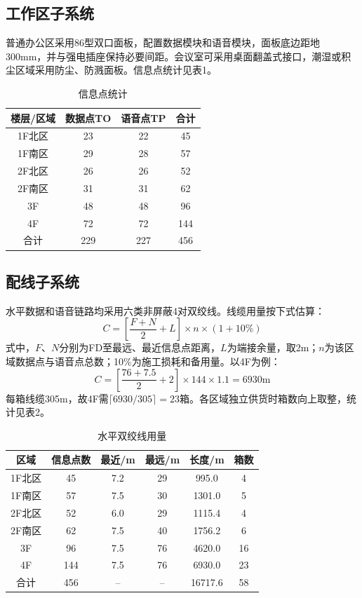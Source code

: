 \documentclass[UTF8,a4paper,12pt]{ctexart}
\begin{document}
\clearpage
\subsection{工作区子系统}
普通办公区采用86型双口面板，配置数据模块和语音模块，面板底边距地300mm，并与强电插座保持必要间距。会议室可采用桌面翻盖式接口，潮湿或积尘区域采用防尘、防溅面板。信息点统计见表1。

\begin{table}[H]
\centering
\caption{信息点统计}
\small
\begin{tabular}{|c|c|c|c|}
\hline
楼层/区域 & 数据点TO & 语音点TP & 合计\\ \hline
1F北区 & 23 & 22 & 45\\
1F南区 & 29 & 28 & 57\\
2F北区 & 26 & 26 & 52\\
2F南区 & 31 & 31 & 62\\
3F & 48 & 48 & 96\\
4F & 72 & 72 & 144\\ \hline
合计 & 229 & 227 & 456\\ \hline
\end{tabular}
\end{table}

\subsection{配线子系统}
水平数据和语音链路均采用六类非屏蔽4对双绞线。线缆用量按下式估算：
\[
C=\left[\frac{F+N}{2}+L\right]\times n\times(1+10\%)
\]
式中，$F$、$N$分别为FD至最远、最近信息点距离，$L$为端接余量，取2m；$n$为该区域数据点与语音点总数；10\%为施工损耗和备用量。以4F为例：
\[
C=\left[\frac{76+7.5}{2}+2\right]\times144\times1.1=6930\text{m}
\]
每箱线缆305m，故4F需$\lceil6930/305\rceil=23$箱。各区域独立供货时箱数向上取整，统计见表2。

\begin{table}[H]
\centering
\caption{水平双绞线用量}
\small
\begin{tabular}{|c|c|c|c|c|c|}
\hline
区域 & 信息点数 & 最近/m & 最远/m & 长度/m & 箱数\\ \hline
1F北区 & 45 & 7.2 & 29 & 995.0 & 4\\
1F南区 & 57 & 7.5 & 30 & 1301.0 & 5\\
2F北区 & 52 & 6.0 & 29 & 1115.4 & 4\\
2F南区 & 62 & 7.5 & 40 & 1756.2 & 6\\
3F & 96 & 7.5 & 76 & 4620.0 & 16\\
4F & 144 & 7.5 & 76 & 6930.0 & 23\\ \hline
合计 & 456 & -- & -- & 16717.6 & 58\\ \hline
\end{tabular}
\end{table}
\end{document}

